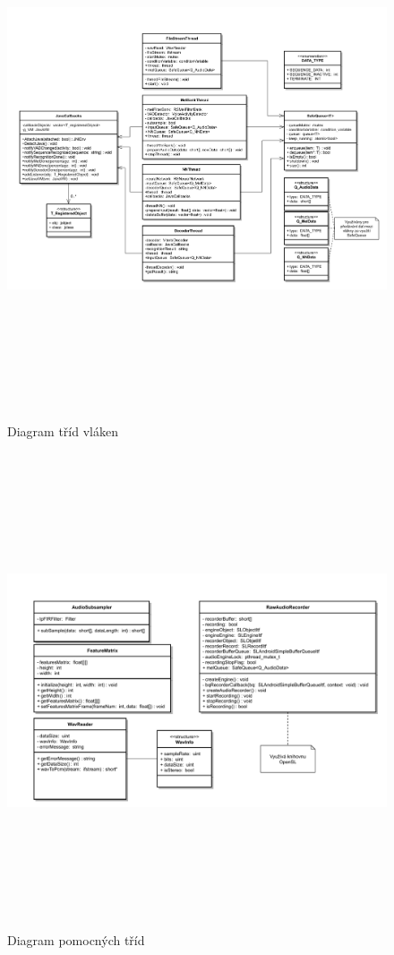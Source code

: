 \begin{figure}\label{app:threads}
	\centering
		\includegraphics[height=16cm, angle=90]{obrazky-figures/classdiagram_threads.pdf}
        \caption{Diagram tříd vláken}
\end{figure}
\begin{figure}[H]\label{app:utility}
	\centering
		\includegraphics[height=14cm, angle=90]{obrazky-figures/classdiagram_utility.pdf}
        \caption{Diagram pomocných tříd}
\end{figure}